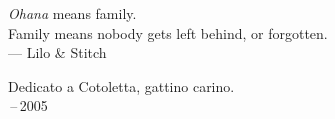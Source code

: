 \thispagestyle{empty}
{}

\vspace*{3cm}

\begin{center}
    \emph{Ohana} means family. \\
    Family means nobody gets left behind, or forgotten. \\ \medskip
    --- Lilo \& Stitch
\end{center}

\medskip

\begin{center}
    Dedicato a Cotoletta, gattino carino. \\ \,--\,2005
\end{center}
